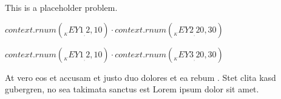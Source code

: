 This is a placeholder problem.
\begin{Problem}
\item ${{context.rnum(__KEY1__, 2, 10)}} \cdot {{context.rnum(__KEY2__, 20, 30)}}$
\item ${{context.rnum(__KEY1__, 2, 10)}} \cdot {{context.rnum(__KEY3__, 20, 30)}}$ 
\item At vero eos et accusam et justo duo dolores et ea rebum . Stet clita kasd gubergren, no sea takimata sanctus est Lorem ipsum dolor sit amet. 
\end{Problem}